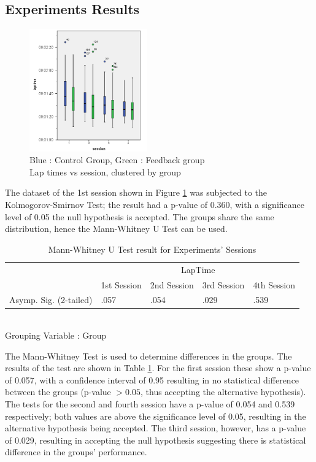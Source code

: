 \documentclass{sig-alternate}
\begin{document}
{\subsection{Experiments Results}

\begin{figure}[!htb]
	\centering
	\includegraphics[width=0.45\textwidth]{charts/laptimes.png}
	\caption[Lap times vs session, clustered by group]{Blue : Control Group, Green : Feedback group \\ Lap times vs session, clustered by group}
	\label{fig:chart-laptimes}
\end{figure}

The dataset of the 1st session shown in Figure \ref{fig:chart-laptimes} was subjected to the Kolmogorov-Smirnov Test; the result had a p-value of 0.360, with a significance level of 0.05 the null hypothesis is accepted. The groups share the same distribution, hence the Mann-Whitney U Test can be used.

\begin{table}
	\centering
	\begin{tabular}{|l|l|l|l|l|}
		\hline
		& \multicolumn{4}{c|}{LapTime}            \\ \cline{2-5} 
		& 1st Session & 2nd Session & 3rd Session & 4th Session \\ \hline
		Asymp. Sig. (2-tailed) & .057 & .054        & .029        & .539        \\ \hline
	\end{tabular}\\
	Grouping Variable : Group
	\caption[Mann-Whitney U Test for Experiments' Sessions]{Mann-Whitney U Test result for Experiments' Sessions}
	\label{table:Mann-Whitney-Sessions}
\end{table}

The Mann-Whitney Test is used to determine differences in the groups. The results of the test are shown in Table \ref{table:Mann-Whitney-Sessions}. For the first session these show a p-value of 0.057, with a confidence interval of 0.95 resulting in no statistical difference between the groups (p-value $> 0.05$, thus accepting the alternative hypothesis).  The tests for the second and fourth session have a p-value of 0.054 and 0.539 respectively; both values are above the significance level of 0.05, resulting in the alternative hypothesis being accepted. The third session, however, has a p-value of 0.029, resulting in accepting the null hypothesis suggesting there is statistical difference in the groups' performance.

}
\end{document}

